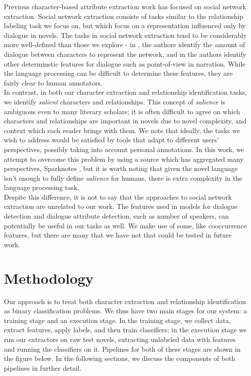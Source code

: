 \documentclass[12pt]{article}
\begin{document}
    Previous character-based attribute extraction work has focused on social network extraction.
    Social network extraction consists of tasks similar to the relationship labeling task we focus on, but which 
    focus on a representation influenced only by dialogue in novels. The tasks in social network
    extraction tend to be considerably more well-defined than those we explore - in \cite{elson2010extracting},
    the authors identify the amount of dialogue between characters to represent the network, and in
    \cite{agarwal2012social} the authors identify other determinstic features for dialogue such as
    point-of-view in narration. While the language processing can be difficult to determine these
    features, they are fairly clear to human annotators. \\

    In contrast, in both our character extraction and relationship identification tasks, we identify
    \emph{salient} characters and relationships. This concept of \emph{salience} is ambiguous even
    to many literary scholars; it is often difficult to agree on which characters and relationships
    are important in novels due to novel complexity, and context which each reader brings with them.
    We note that ideally, the tasks we wish to address would be satisfied by tools that adapt to
    different users' perspectives, possibly taking into account personal annotations. In this work,
    we attempt to overcome this problem by using a source which has aggregated many perspectives,
    Sparknotes \cite{sparknotes}, but it is worth noting that given the novel language isn't
    enough to fully define \emph{salience} for humans, there is extra complexity in the language
    processing task. \\

    Despite this difference, it is not to say that the approaches to social network extraction are
    unrelated to our work. The features used in models for dialogue detection and dialogue attribute
    detection, such as number of speakers, can potentially be useful in our tasks as well. We make use
    of some, like cooccurrence features, but there are many that we have not that could be tested
    in future work.

\section{Methodology}

Our approach is to treat both character extraction and relationship identification as binary classification problems. 
We thus have two main stages for our system: a training stage and an execution stage. 
In the training stage, we collect data, extract features, apply labels, and then train classifiers; 
in the execution stage we run our extractors on raw test novels, extracting unlabeled data with features 
and running the classifiers on it. Pipelines for both of these stages are shown in the figure below. 
In the following sections, we discuss the components of both pipelines in further detail.\\
\end{document}
